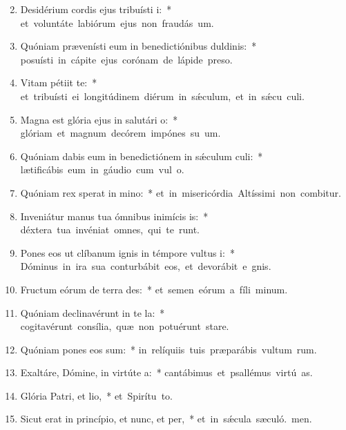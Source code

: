 \begin{flushleft}
\begin{enumerate}[leftmargin=*]
\setcounter{enumi}{1}

\item Desidérium cordis ejus tribuísti i:~* \mbox{et voluntáte labiórum ejus non fraudás um.}

\item Quóniam prævenísti eum in benedictiónibus duldinis:~* \mbox{posuísti in cápite ejus corónam de lápide preso.}

\item Vitam pétiit  te:~* \mbox{et tribuísti ei longitúdinem diérum in sǽculum, et in sǽcu culi.}

\item Magna est glória ejus in salutári o:~* \mbox{glóriam et magnum decórem impónes su um.}

\item Quóniam dabis eum in benedictiónem in sǽculum culi:~* \mbox{lætificábis eum in gáudio cum vul o.}

\item Quóniam rex sperat in mino:~* \mbox{et in misericórdia Altíssimi non combitur.}

\item Inveniátur manus tua ómnibus inimícis is:~* \mbox{déxtera tua invéniat omnes, qui te runt.}

\item Pones eos ut clíbanum ignis in témpore vultus i:~* \mbox{Dóminus in ira sua conturbábit eos, et devorábit e gnis.}

\item Fructum eórum de terra des:~* \mbox{et semen eórum a fíli minum.}

\item Quóniam declinavérunt in te la:~* \mbox{cogitavérunt consília, quæ non potuérunt stare.}

\item Quóniam pones eos sum:~* \mbox{in relíquiis tuis præparábis vultum rum.}

\item Exaltáre, Dómine, in virtúte a:~* \mbox{cantábimus et psallémus virtú as.}

\item Glória Patri, et lio,~* \mbox{et Spirítu to.}

\item Sicut erat in princípio, et nunc, et per,~* \mbox{et in sǽcula sæculó. men.}

\end{enumerate}
\end{flushleft}

